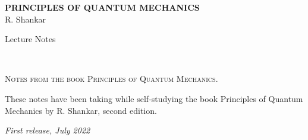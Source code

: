 \documentclass[11pt,fleqn]{book} %
\begin{document}

\begingroup
\thispagestyle{empty}
\centering
\vspace*{5cm}
\par\normalfont\fontsize{35}{35}\sffamily\selectfont
\textbf{PRINCIPLES OF QUANTUM MECHANICS}\\
{\LARGE R. Shankar}\par %
\vspace*{1cm}
{\Huge Lecture Notes}\par %
\endgroup


\newpage
~\vfill
\thispagestyle{empty}


\noindent \textsc{Notes from the book Principles of Quantum Mechanics.}
\vspace{\baselineskip}

\noindent These notes have been taking while self-studying the book Principles of Quantum Mechanics by R. Shankar, second edition.

\noindent \textit{First release, July 2022} %



\pagestyle{empty} %

\tableofcontents %


\pagestyle{fancy} %

\end{document}
